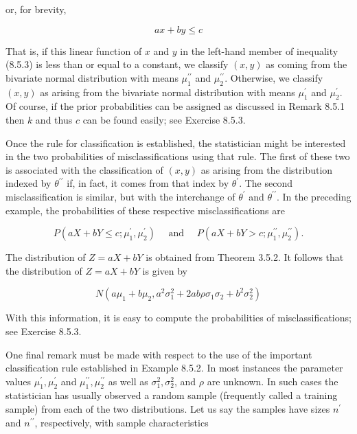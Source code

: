 or, for brevity,


\begin{equation*}
a x+b y \leq c \tag{8.5.3}
\end{equation*}


That is, if this linear function of $x$ and $y$ in the left-hand member of inequality (8.5.3) is less than or equal to a constant, we classify $(x, y)$ as coming from the bivariate normal distribution with means $\mu_{1}^{\prime \prime}$ and $\mu_{2}^{\prime \prime}$. Otherwise, we classify $(x, y)$ as arising from the bivariate normal distribution with means $\mu_{1}^{\prime}$ and $\mu_{2}^{\prime}$. Of course, if the prior probabilities can be assigned as discussed in Remark 8.5.1 then $k$ and thus $c$ can be found easily; see Exercise 8.5.3.

Once the rule for classification is established, the statistician might be interested in the two probabilities of misclassifications using that rule. The first of these two is associated with the classification of $(x, y)$ as arising from the distribution indexed by $\theta^{\prime \prime}$ if, in fact, it comes from that index by $\theta^{\prime}$. The second misclassification is similar, but with the interchange of $\theta^{\prime}$ and $\theta^{\prime \prime}$. In the preceding example, the probabilities of these respective misclassifications are

$$
P\left(a X+b Y \leq c ; \mu_{1}^{\prime}, \mu_{2}^{\prime}\right) \quad \text { and } \quad P\left(a X+b Y>c ; \mu_{1}^{\prime \prime}, \mu_{2}^{\prime \prime}\right) .
$$

The distribution of $Z=a X+b Y$ is obtained from Theorem 3.5.2. It follows that the distribution of $Z=a X+b Y$ is given by

$$
N\left(a \mu_{1}+b \mu_{2}, a^{2} \sigma_{1}^{2}+2 a b \rho \sigma_{1} \sigma_{2}+b^{2} \sigma_{2}^{2}\right)
$$

With this information, it is easy to compute the probabilities of misclassifications; see Exercise 8.5.3.

One final remark must be made with respect to the use of the important classification rule established in Example 8.5.2. In most instances the parameter values $\mu_{1}^{\prime}, \mu_{2}^{\prime}$ and $\mu_{1}^{\prime \prime}, \mu_{2}^{\prime \prime}$ as well as $\sigma_{1}^{2}, \sigma_{2}^{2}$, and $\rho$ are unknown. In such cases the statistician has usually observed a random sample (frequently called a training sample) from each of the two distributions. Let us say the samples have sizes $n^{\prime}$ and $n^{\prime \prime}$, respectively, with sample characteristics

